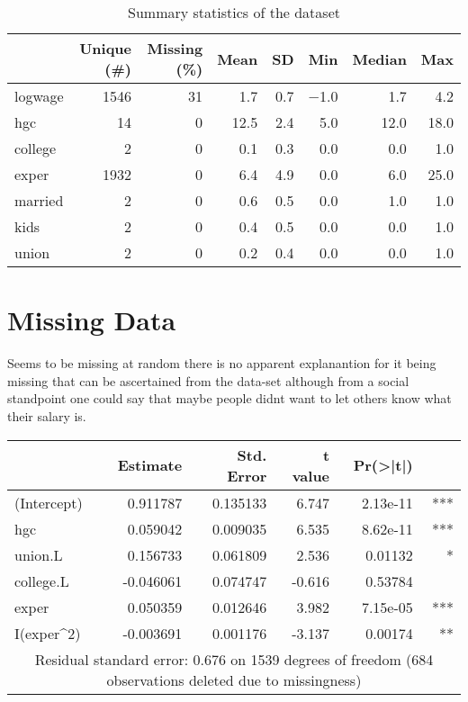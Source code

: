 \documentclass{article}
\begin{document}
\begin{table}
\centering
\begin{tabular}[t]{lrrrrrrr}
\toprule
  & Unique (\#) & Missing (\%) & Mean & SD & Min & Median & Max\\
\midrule
logwage & 1546 & 31 & \num{1.7} & \num{0.7} & \num{-1.0} & \num{1.7} & \num{4.2}\\
hgc & 14 & 0 & \num{12.5} & \num{2.4} & \num{5.0} & \num{12.0} & \num{18.0}\\
college & 2 & 0 & \num{0.1} & \num{0.3} & \num{0.0} & \num{0.0} & \num{1.0}\\
exper & 1932 & 0 & \num{6.4} & \num{4.9} & \num{0.0} & \num{6.0} & \num{25.0}\\
married & 2 & 0 & \num{0.6} & \num{0.5} & \num{0.0} & \num{1.0} & \num{1.0}\\
kids & 2 & 0 & \num{0.4} & \num{0.5} & \num{0.0} & \num{0.0} & \num{1.0}\\
union & 2 & 0 & \num{0.2} & \num{0.4} & \num{0.0} & \num{0.0} & \num{1.0}\\
\bottomrule
\end{tabular}
\caption{Summary statistics of the dataset}
\end{table}


\section{Missing Data }
Seems to be missing at random there is no apparent explanantion for it being missing that can be ascertained from the data-set although from a social standpoint one could say that maybe people didnt want to let others know what their salary is.


\begin{tabular}{lrrrrr}
\hline
& Estimate & Std. Error & t value & Pr(\textgreater|t|) & \\ 
\hline
(Intercept) & 0.911787 & 0.135133 & 6.747 & 2.13e-11 & *** \\
hgc & 0.059042 & 0.009035 & 6.535 & 8.62e-11 & *** \\
union.L & 0.156733 & 0.061809 & 2.536 & 0.01132 & * \\
college.L & -0.046061 & 0.074747 & -0.616 & 0.53784 & \\
exper & 0.050359 & 0.012646 & 3.982 & 7.15e-05 & *** \\
I(exper\textasciicircum 2) & -0.003691 & 0.001176 & -3.137 & 0.00174 & ** \\
\hline
\multicolumn{6}{c}{Residual standard error: 0.676 on 1539 degrees of freedom (684 observations deleted due to missingness)}\\
\hline
\end{tabular}
\end{document}

